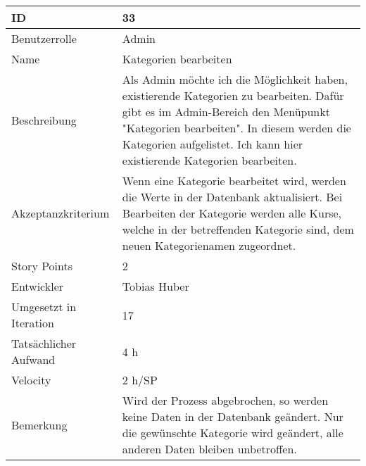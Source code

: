 \begin{tabularx}{\textwidth}{|p{}|X|}
	\hline
	ID & 33 \\
	\hline
	Benutzerrolle & Admin \\
	\hline
	Name & Kategorien bearbeiten\\
	\hline
	Beschreibung & Als Admin möchte ich die Möglichkeit haben, existierende Kategorien zu bearbeiten. Dafür gibt es im Admin-Bereich den Menüpunkt "Kategorien bearbeiten". In diesem werden die Kategorien aufgelistet. Ich kann hier existierende Kategorien bearbeiten. \\
	\hline
	Akzeptanzkriterium & Wenn eine Kategorie bearbeitet wird, werden die Werte in der Datenbank aktualisiert. Bei Bearbeiten der Kategorie werden alle Kurse, welche in der betreffenden Kategorie sind, dem neuen Kategorienamen zugeordnet. \\
	\hline
	Story Points & 2 \\
	\hline
	Entwickler &  Tobias Huber\\
	\hline
	Umgesetzt in Iteration & 17\\
	\hline
	Tatsächlicher Aufwand & 4 h\\
	\hline
	Velocity & 2 h/SP\\
	\hline
	Bemerkung & Wird der Prozess abgebrochen, so werden keine Daten in der Datenbank geändert. Nur die gewünschte Kategorie wird geändert, alle anderen Daten bleiben unbetroffen. \\
	\hline
\end{tabularx}
\vspace{20pt}

